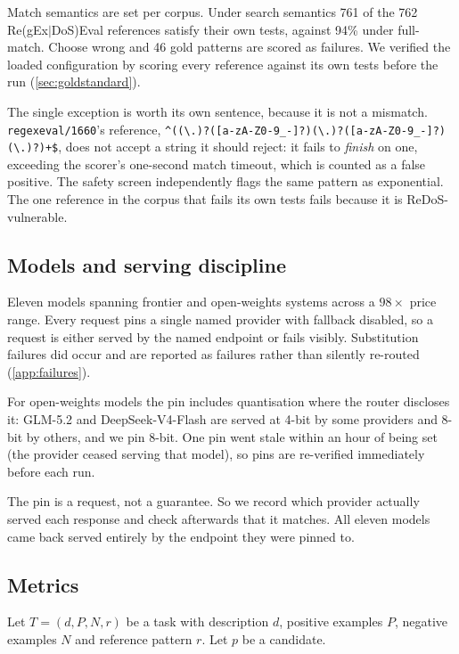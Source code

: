 \documentclass[11pt]{article}
\begin{document}
Match semantics are set per corpus. Under search semantics 761 of the 762
Re(gEx$|$DoS)Eval references satisfy their own tests, against 94\% under
full-match. Choose wrong and 46 gold patterns are scored as failures. We
verified the loaded configuration by scoring every reference against its own
tests before the run (\cref{sec:goldstandard}).

The single exception is worth its own sentence, because it is not a mismatch.
\texttt{regexeval/1660}'s reference,
\lstinline!^((\.)?([a-zA-Z0-9_-]?)(\.)?([a-zA-Z0-9_-]?)(\.)?)+$!, does not
accept a string it should reject: it fails to \emph{finish} on one, exceeding
the scorer's one-second match timeout, which is counted as a false positive.
The safety screen independently flags the same pattern as exponential. The one
reference in the corpus that fails its own tests fails because it is
ReDoS-vulnerable.

\subsection{Models and serving discipline}
\label{sec:serving}

Eleven models spanning frontier and open-weights systems across a $98\times$
price range. Every request pins a single named provider with fallback
disabled, so a request is either served by the named endpoint or fails
visibly. Substitution failures did occur and are reported as failures rather
than silently re-routed (\cref{app:failures}).

For open-weights models the pin includes quantisation where the router
discloses it: GLM-5.2 and DeepSeek-V4-Flash are served at 4-bit by some
providers and 8-bit by others, and we pin 8-bit. One pin went stale within an
hour of being set (the provider ceased serving that model), so pins are
re-verified immediately before each run.

The pin is a request, not a guarantee. So we record which provider actually
served each response and check afterwards that it matches. All eleven models
came back served entirely by the endpoint they were pinned to.

\subsection{Metrics}
\label{sec:metrics}

Let $T=(d, P, N, r)$ be a task with description $d$, positive examples $P$,
negative examples $N$ and reference pattern $r$. Let $p$ be a candidate.
\end{document}
